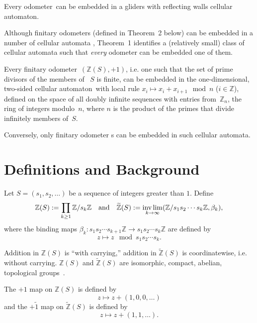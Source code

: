\documentclass[12pt]{amsart}
\begin{document}
\begin{Th1}
Every {odometer}\ can be embedded in a  gliders with reflecting  walls {cellular automaton}.
\end{Th1}

Although finitary odometers (defined in Theorem~2 below) can be embedded in a number of cellular automata \cite{PY}, Theorem~1 identifies a (relatively small) class of cellular automata such that \emph{every\/} odometer can be embedded one of them.

\begin{Th2}
Every finitary {odometer}\ $({\mathbb Z}(S),+1)$, i.e. one  such that the set of prime divisors of the members of ~$S$ is finite, can be embedded in the one-dimensional, two-sided {cellular automaton}\  with local rule $x_i \mapsto x_i + x_{i+1}  \mod n$  ($i \in \mathbb Z$), defined on the space of all doubly infinite sequences with entries from~${\mathbb Z}_n$, the ring of integers modulo~$n$,  where $n$ is the product of the primes that divide  infinitely members of~$S$.

Conversely, only finitary  {odometer} s can be embedded in such  {cellular automata}. 
\end{Th2}

 

\section*{Definitions and Background}

 

Let $S = (s_1,s_2,\dots)$ be a sequence of integers greater than $1$.
Define
$${\mathbb Z}(S) := \prod_{k\ge1}
{\mathbb Z}/s_k{\mathbb Z}
\text{\hbox{ }\hbox{ } and \hbox{ }\hbox{ }}
\widetilde{\mathbb Z}(S) := \operatorname*{inv\,lim}_{k \to \infty}
({\mathbb Z}/s_1s_2\cdots s_k{\mathbb Z}, \beta_k),$$
where the binding maps 
$\beta_k : s_1s_2\cdots s_{k+1}{\mathbb Z}\to
s_1s_2\cdots s_k{\mathbb Z}$
are defined by 
$$z \mapsto z \mod s_1s_2\cdots s_k.$$

\noindent Addition in ${\mathbb Z}(S)$ is ``with carrying,'' addition in $\widetilde{\mathbb Z}(S)$ is coordinatewise, i.e. without carrying. 
${\mathbb Z}(S)$ and $\widetilde{\mathbb Z}(S)$ are
isomorphic, compact, abelian, topological groups~\cite{D}. 

The $+1$ map on ${\mathbb Z}(S)$ is defined by
$$z \mapsto z + (1,0,0,\dots)$$ 
and the $+\tilde1$ map on $\widetilde{\mathbb Z}(S)$ is defined by
$$z \mapsto z + (1,1,\dots).$$ 
\end{document}
